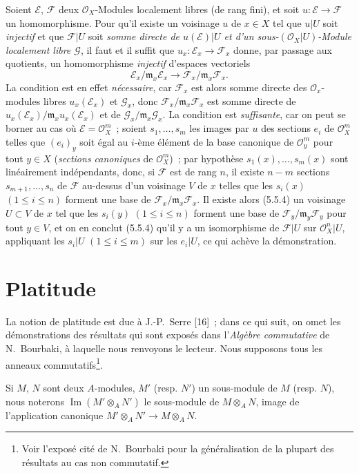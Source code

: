 \begin{env}[5.5.5]
\label{0.5.5.5-fr}
Soient $\mathcal{E}$, $\mathcal{F}$ deux $\mathcal{O}_X$-Modules localement
libres (de rang fini), et soit $u:\mathcal{E}\to\mathcal{F}$ un
homomorphisme. Pour qu'il existe un voisinage $u$ de $x\in X$ tel que $u|U$
soit \emph{injectif} et que $\mathcal{F}|U$ soit \emph{somme directe de
$u(\mathcal{E})|U$ et d'un sous-$(\mathcal{O}_X|U)$-Module localement libre
$\mathcal{G}$}, il faut et il suffit que
$u_x:\mathcal{E}_x\to\mathcal{F}_x$ donne, par passage aux quotients, un
homomorphisme \emph{injectif} d'espaces vectoriels
\[
  \mathcal{E}_x/\mathfrak{m}_x\mathcal{E}_x
  \longrightarrow
  \mathcal{F}_x/\mathfrak{m}_x\mathcal{F}_x.
\]
La condition est en effet \emph{nécessaire}, car $\mathcal{F}_x$ est alors
somme directe des $\mathcal{O}_x$-modules libres $u_x(\mathcal{E}_x)$ et
$\mathcal{G}_x$, donc $\mathcal{F}_x/\mathfrak{m}_x\mathcal{F}_x$ est somme
directe de
$u_x(\mathcal{E}_x)/\mathfrak{m}_x u_x(\mathcal{E}_x)$ et de
$\mathcal{G}_x/\mathfrak{m}_x\mathcal{G}_x$. La condition est
\emph{suffisante}, car on peut se borner au cas où
$\mathcal{E}=\mathcal{O}_X^m$~; soient $s_1,\ldots,s_m$ les images par $u$ des
sections $e_i$ de $\mathcal{O}_X^m$ telles que $(e_i)_y$ soit égal au $i$-ème
élément de la base canonique de $\mathcal{O}_y^m$ pour tout $y\in X$
(\emph{sections canoniques} de $\mathcal{O}_X^m$)~; par hypothèse
$s_1(x),\ldots,s_m(x)$ sont linéairement indépendants, donc, si $\mathcal{F}$
est de rang $n$, il existe $n-m$ sections $s_{m+1},\ldots,s_n$ de
$\mathcal{F}$ au-dessus d'un voisinage $V$ de $x$ telles que les $s_i(x)$
$(1\leq i\leq n)$ forment une base de
$\mathcal{F}_x/\mathfrak{m}_x\mathcal{F}_x$. Il existe alors (5.5.4) un
voisinage $U\subset V$ de $x$ tel que les $s_i(y)$ $(1\leq i\leq n)$ forment
une base de $\mathcal{F}_y/\mathfrak{m}_y\mathcal{F}_y$ pour tout $y\in V$,
et on en conclut (5.5.4) qu'il y a un isomorphisme de $\mathcal{F}|U$ sur
$\mathcal{O}_X^n|U$, appliquant les $s_i|U$ $(1\leq i\leq m)$ sur les
$e_i|U$, ce qui achève la démonstration.
\end{env}

\section{Platitude}
\label{section:0.6-fr}

\begin{env}[6.0]
\label{0.6.0.0-fr}
La notion de platitude est due à J.-P.~Serre [16]~; dans ce qui suit, on omet
les démonstrations des résultats qui sont exposés dans l'\emph{Algèbre
commutative} de N.~Bourbaki, à laquelle nous renvoyons le lecteur. Nous
supposons tous les anneaux commutatifs\footnote{Voir l'exposé cité de
N.~Bourbaki pour la généralisation de la plupart des résultats au cas non
commutatif.}.


Si $M$, $N$ sont deux $A$-modules, $M'$ (resp. $N'$) un sous-module de $M$
(resp. $N$), nous noterons $\operatorname{Im}(M'\otimes_A N')$ le sous-module
de $M\otimes_A N$, image de l'application canonique
$M'\otimes_A N'\to M\otimes_A N$.
\end{env}

